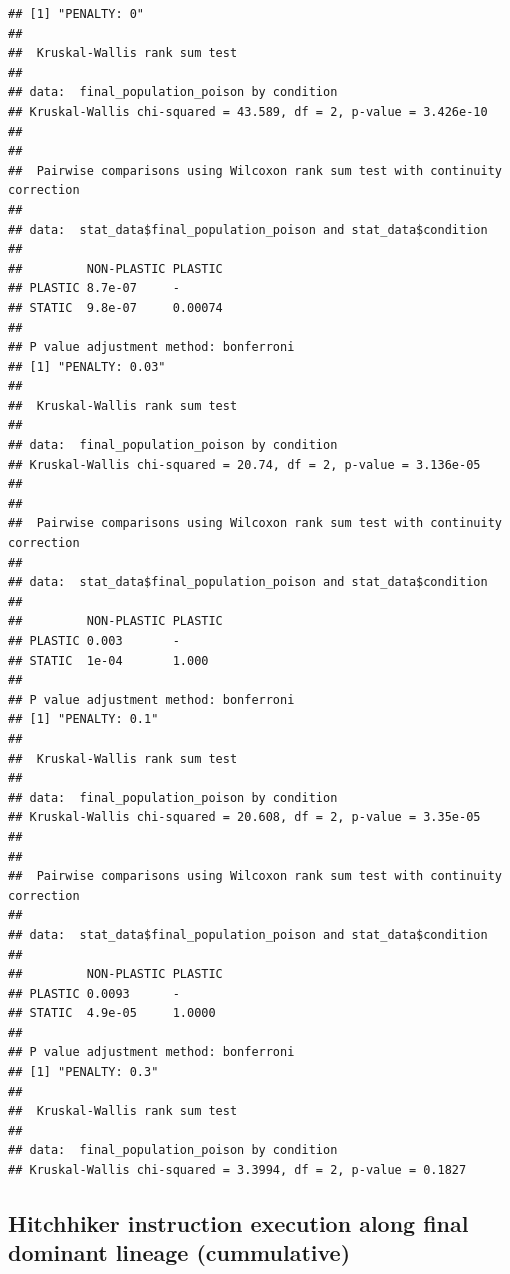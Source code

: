 \documentclass[]{book}
\begin{document}
\begin{verbatim}
## [1] "PENALTY: 0"
## 
##  Kruskal-Wallis rank sum test
## 
## data:  final_population_poison by condition
## Kruskal-Wallis chi-squared = 43.589, df = 2, p-value = 3.426e-10
## 
## 
##  Pairwise comparisons using Wilcoxon rank sum test with continuity correction 
## 
## data:  stat_data$final_population_poison and stat_data$condition 
## 
##         NON-PLASTIC PLASTIC
## PLASTIC 8.7e-07     -      
## STATIC  9.8e-07     0.00074
## 
## P value adjustment method: bonferroni 
## [1] "PENALTY: 0.03"
## 
##  Kruskal-Wallis rank sum test
## 
## data:  final_population_poison by condition
## Kruskal-Wallis chi-squared = 20.74, df = 2, p-value = 3.136e-05
## 
## 
##  Pairwise comparisons using Wilcoxon rank sum test with continuity correction 
## 
## data:  stat_data$final_population_poison and stat_data$condition 
## 
##         NON-PLASTIC PLASTIC
## PLASTIC 0.003       -      
## STATIC  1e-04       1.000  
## 
## P value adjustment method: bonferroni 
## [1] "PENALTY: 0.1"
## 
##  Kruskal-Wallis rank sum test
## 
## data:  final_population_poison by condition
## Kruskal-Wallis chi-squared = 20.608, df = 2, p-value = 3.35e-05
## 
## 
##  Pairwise comparisons using Wilcoxon rank sum test with continuity correction 
## 
## data:  stat_data$final_population_poison and stat_data$condition 
## 
##         NON-PLASTIC PLASTIC
## PLASTIC 0.0093      -      
## STATIC  4.9e-05     1.0000 
## 
## P value adjustment method: bonferroni 
## [1] "PENALTY: 0.3"
## 
##  Kruskal-Wallis rank sum test
## 
## data:  final_population_poison by condition
## Kruskal-Wallis chi-squared = 3.3994, df = 2, p-value = 0.1827
\end{verbatim}

\hypertarget{hitchhiker-instruction-execution-along-final-dominant-lineage-cummulative}{%
\subsection{Hitchhiker instruction execution along final dominant lineage (cummulative)}\label{hitchhiker-instruction-execution-along-final-dominant-lineage-cummulative}}
\end{document}
